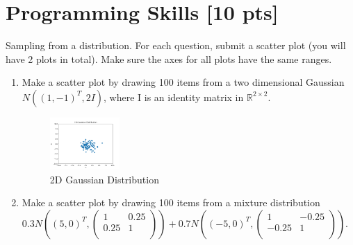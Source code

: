 \documentclass[a4paper]{article}
\theoremstyle{definition}
\newenvironment{soln}{
	\leavevmode\color{blue}\ignorespaces
}{}
\begin{document}
	\section{Programming Skills [10 pts]}
	Sampling from a distribution.  For each question, submit a scatter plot (you will have 2 plots in total).  Make sure the axes for all plots have the same ranges.
	\begin{enumerate}
		\item Make a scatter plot by drawing 100 items from a two dimensional Gaussian $N((1, -1)^{T}, 2I)$, where I is an identity matrix in $\mathbb{R}^{2 \times 2}$.
		
			\begin{soln}
			\begin{figure}[h!]
			    \centering
			    \includegraphics[width=0.25\textwidth]{images/2d_gaussian.png}  
			    \captionsetup{labelformat=empty}
			    \caption{2D Gaussian Distribution}
			    \label{fig:2dgaussian}
			\end{figure}
		\end{soln}
	
		\item Make a scatter plot by drawing 100 items from a mixture distribution 
		$0.3 N\left((5, 0)^{T}, \begin{pmatrix} 1 & 0.25 \\ 0.25 & 1\\ \end{pmatrix}\right)
		+0.7 N\left((-5, 0)^{T}, \begin{pmatrix} 1 & -0.25 \\ -0.25 & 1\\ \end{pmatrix}\right)
		$.
		

\end{enumerate}
\end{document}
